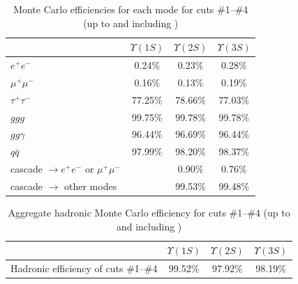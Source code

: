 \begin{table}[t]
  \caption{\label{efficiency_montecarlo} Monte Carlo efficiencies for
    each mode for cuts \#1--\#4 (up to and including \pone)}
  \begin{center}
    \begin{tabular}{l c c c}
       & $\Upsilon(1S)$ & $\Upsilon(2S)$ & $\Upsilon(3S)$ \\\hline
      $e^+e^-$ & 0.24\% & 0.23\% & 0.28\% \\
      $\mu^+\mu^-$ & 0.16\% & 0.13\% & 0.19\% \\
      $\tau^+\tau^-$ & 77.25\% & 78.66\% & 77.03\% \\
      $ggg$ & 99.75\% & 99.78\% & 99.78\% \\
      $gg\gamma$ & 96.44\% & 96.69\% & 96.44\% \\
      $q\bar{q}$ & 97.99\% & 98.20\% & 98.37\% \\
      cascade $\to e^+e^-$ or $\mu^+\mu^-$ & & 0.90\% & 0.76\% \\
      cascade $\to$ other modes & & 99.53\% & 99.48\% \\
    \end{tabular}
  \end{center}
\end{table}

\begin{table}[p]
  \caption{\label{efficiency_montecarlo3} Aggregate hadronic Monte
    Carlo efficiency for cuts \#1--\#4 (up to and including \pone)}
  \begin{center}
    \begin{tabular}{l c c c}
       & $\Upsilon(1S)$ & $\Upsilon(2S)$ & $\Upsilon(3S)$ \\\hline
      Hadronic efficiency of cuts \#1--\#4 & 99.52\% & 97.92\% & 98.19\% \\
    \end{tabular}
  \end{center}
\end{table}

